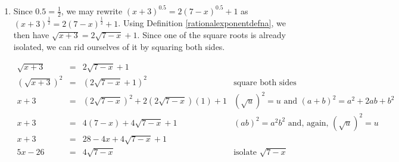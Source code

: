 \documentclass{ximera}
\begin{document}
\begin{example}
\begin{enumerate}
\[\begin{array}{rclr}
\sqrt{(\sqrt[3]{2t-1})^2 } & = & \sqrt{4} & \text{extract square roots} \\

|\sqrt[3]{2t-1}| & = & 2 & \text{$\sqrt{u^2} = |u|$} \\

\sqrt[3]{2t-1} & = & \pm 2 & \text{ for $c>0$, $|u| = c$ is equivalent to $u = \pm c$.} \end{array} \]

From $\sqrt[3]{2t-1}  = 2$ we cube both sides and obtain $2t-1 = 8$, so $t = \frac{9}{2} = 4.5$.  Similarly, from $\sqrt[3]{2t-1}  = -2$, we cube both sides and obtain $2t-1 = -8$, so $t = -\frac{7}{2} = -3.5$.  Both of these solutions check in the given equation.

In this case we are looking for where the graph of $f(t) = (2t-1)^{\frac{2}{3}} -4$ intersects the graph of $g(t) = 0$ - i.e., the $t$-intercepts of the graph of $g$.  We find these are $(-3.5,0)$ and $(4.5,0)$, as verified below using desmos.

\begin{center}
\end{center} 

\item Since $0.5 = \frac{1}{2}$, we may rewrite $(x+3)^{0.5} = 2(7-x)^{0.5}+1$ as  $(x+3)^{\frac{1}{2}} = 2(7-x)^{\frac{1}{2}}+1$.  Using Definition \ref{rationalexponentdefna}, we then have $\sqrt{x+3} = 2\sqrt{7-x} + 1$.  Since one of the square roots is already isolated, we can rid ourselves of it by squaring both sides.

\[ \begin{array}{rclr}

\sqrt{x+3} & = & 2\sqrt{7-x} + 1 & \\

 (\sqrt{x+3})^2 & = & (2\sqrt{7-x} + 1)^2 & \text{square both sides} \\
 
 x+3 & = & (2 \sqrt{7-x})^2 + 2 (2 \sqrt{7-x})(1) + 1 & \text{$(\sqrt{u})^2 = u$ and $(a+b)^2 = a^2 + 2ab +b^2$} \\

 
 x+3 & = & 4(7-x) + 4\sqrt{7-x} + 1 &  \text{$(ab)^2 = a^2b^2$ and, again, $(\sqrt{u})^2 = u$} \\
 
 x+3 & = & 28-4x+4\sqrt{7-x} + 1 & \\
 
 5x-26 & = & 4\sqrt{7-x} & \text{isolate $\sqrt{7-x}$} \\ \end{array} \]
 

\end{enumerate}
\end{example}
\end{document}
